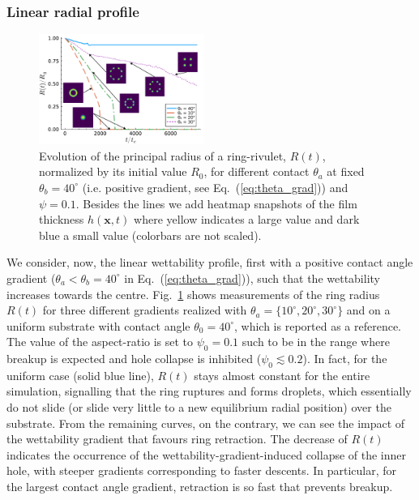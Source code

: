\documentclass[twoside,twocolumn,9pt]{article}
\begin{document}
\subsubsection{Linear radial profile}\label{subsubsec:linwettgrad}
\begin{figure}
    \centering
    \includegraphics[width=0.48\textwidth]{Figure_7.pdf}
    \caption{Evolution of the principal radius of a ring-rivulet, $R(t)$, normalized by its initial value $R_0$, for different contact $\theta_a$ at fixed $\theta_b = 40^{\circ}$ (i.e. positive gradient, see Eq.~(\ref{eq:theta_grad})) and $\psi = 0.1$.
    Besides the lines we add heatmap snapshots of the film thickness $h(\mathbf{x},t)$ where yellow indicates a large value and dark blue a small value (colorbars are not scaled).}
    \label{fig:negativewetgrad}
\end{figure}
We consider, now, the linear wettability profile, first with a positive contact angle gradient ($\theta_a < \theta_b=40^{\circ}$ in Eq.~(\ref{eq:theta_grad})), such that the wettability increases towards the centre. 
Fig.~\ref{fig:negativewetgrad} shows measurements of the ring radius $R(t)$ for three different gradients realized with $\theta_a = \{ 10^{\circ}, 20^{\circ}, 30^{\circ} \}$ and on a uniform substrate with contact angle $\theta_0 = 40^{\circ}$, which is reported as a reference. 
The value of the aspect-ratio is set to $\psi_0 = 0.1$ such to be in the range where breakup is expected and hole collapse is inhibited ($\psi_0 \lesssim 0.2$).
In fact, for the uniform case (solid blue line), $R(t)$ stays almost constant for the entire simulation, signalling that the ring ruptures and forms droplets, which essentially do not slide (or slide very little to a new equilibrium radial position) over the substrate.
From the remaining curves, on the contrary, we can see the impact of the wettability gradient that favours ring retraction. 
The decrease of $R(t)$ indicates the occurrence of the wettability-gradient-induced collapse of the inner hole, with steeper gradients corresponding to faster descents.
In particular, for the largest contact angle gradient, retraction is so fast that prevents breakup. 
\end{document}
